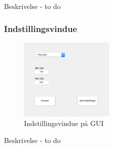 Beskrivelse - to do
\subsubsection{Indstillingsvindue}
\begin{figure}[H]
	\centering
	\includegraphics[width=0.4\textwidth]{billeder/software/settings.png}
	\caption{Indstillingsvindue på GUI}
	\label{fig:finishedSettings}
\end{figure}

Beskrivelse - to do

%
%
